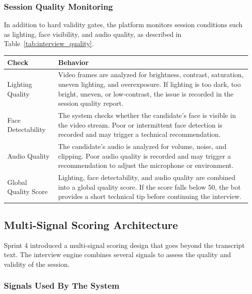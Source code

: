 \subsubsection{Session Quality Monitoring}

In addition to hard validity gates, the platform monitors session conditions such as lighting, face visibility, and audio quality, as described in Table~\ref{tab:interview_quality}.

\begin{center}
\label{tab:interview_quality}
\renewcommand{\arraystretch}{1.2}
\begin{tabularx}{\textwidth}{|p{3.5cm}|X|}
\hline
\rowcolor{gray!20} \textbf{Check} & \textbf{Behavior} \\
\hline
Lighting Quality &
Video frames are analyzed for brightness, contrast, saturation, uneven lighting, and overexposure. If lighting is too dark, too bright, uneven, or low-contrast, the issue is recorded in the session quality report. \\
\hline
Face Detectability &
The system checks whether the candidate's face is visible in the video stream. Poor or intermittent face detection is recorded and may trigger a technical recommendation. \\
\hline
Audio Quality &
The candidate's audio is analyzed for volume, noise, and clipping. Poor audio quality is recorded and may trigger a recommendation to adjust the microphone or environment. \\
\hline
Global Quality Score &
Lighting, face detectability, and audio quality are combined into a global quality score. If the score falls below 50, the bot provides a short technical tip before continuing the interview. \\
\hline
\end{tabularx}
\end{center}

\subsection{Multi-Signal Scoring Architecture}
\label{sec:sprint4:multi_signal_scoring}

Sprint 4 introduced a multi-signal scoring design that goes beyond the transcript text. The interview engine combines several signals to assess the quality and validity of the session.

\subsubsection{Signals Used By The System}

